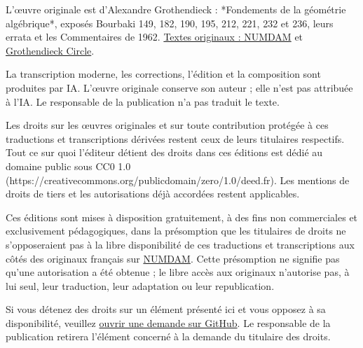 \begingroup\small
L’œuvre originale est d’Alexandre Grothendieck : *Fondements de la géométrie algébrique*, exposés Bourbaki 149, 182, 190, 195, 212, 221, 232 et 236, leurs errata et les Commentaires de 1962. \href{https://www.numdam.org/}{Textes originaux : NUMDAM} et \href{https://webusers.imj-prg.fr/~leila.schneps/grothendieckcircle/FGA.pdf}{Grothendieck Circle}.

La transcription moderne, les corrections, l’édition et la composition sont produites par IA. L’œuvre originale conserve son auteur ; elle n’est pas attribuée à l’IA. Le responsable de la publication n’a pas traduit le texte.

Les droits sur les œuvres originales et sur toute contribution protégée à ces traductions et transcriptions dérivées restent ceux de leurs titulaires respectifs. Tout ce sur quoi l'éditeur détient des droits dans ces éditions est dédié au domaine public sous CC0 1.0 (https://creativecommons.org/publicdomain/zero/1.0/deed.fr). Les mentions de droits de tiers et les autorisations déjà accordées restent applicables.

Ces éditions sont mises à disposition gratuitement, à des fins non commerciales et exclusivement pédagogiques, dans la présomption que les titulaires de droits ne s'opposeraient pas à la libre disponibilité de ces traductions et transcriptions aux côtés des originaux français sur \href{https://www.numdam.org/journals/PMIHES/}{NUMDAM}. Cette présomption ne signifie pas qu'une autorisation a été obtenue ; le libre accès aux originaux n'autorise pas, à lui seul, leur traduction, leur adaptation ou leur republication.

Si vous détenez des droits sur un élément présenté ici et vous opposez à sa disponibilité, veuillez \href{https://github.com/KokunoYumeto/fga-fr/issues}{ouvrir une demande sur GitHub}. Le responsable de la publication retirera l'élément concerné à la demande du titulaire des droits.

\par\endgroup\clearpage
